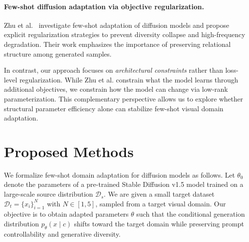 \documentclass{article}
\begin{document}
\paragraph{Few-shot diffusion adaptation via objective regularization.}
Zhu et al.\ \cite{zhu2023fewshot} investigate few-shot adaptation of diffusion models and propose explicit regularization strategies to prevent diversity collapse and high-frequency degradation. Their work emphasizes the importance of preserving relational structure among generated samples. 

In contrast, our approach focuses on \emph{architectural constraints} rather than loss-level regularization. While Zhu et al.\cite{zhu2023fewshot} constrain what the model learns through additional objectives, we constrain how the model can change via low-rank parameterization. This complementary perspective allows us to explore whether structural parameter efficiency alone can stabilize few-shot visual domain adaptation.







\section{Proposed Methods}

\label{methods}

We formalize few-shot domain adaptation for diffusion models as follows. 
Let $\theta_0$ denote the parameters of a pre-trained Stable Diffusion v1.5 model trained on a large-scale source distribution $\mathcal{D}_s$. 
We are given a small target dataset $\mathcal{D}_t = \{x_i\}_{i=1}^N$ with $N \in [1,5]$, sampled from a target visual domain. 
Our objective is to obtain adapted parameters $\theta$ such that the conditional generation distribution 
$p_\theta(x \mid c)$ shifts toward the target domain while preserving prompt controllability and generative diversity.
\end{document}
